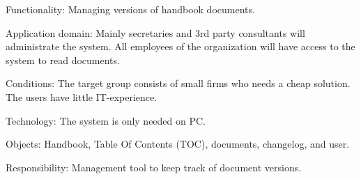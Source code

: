 Functionality: Managing versions of handbook documents.

Application domain: Mainly secretaries and 3rd party consultants will administrate the system. All employees of the organization will have access to the system to read documents.

Conditions: The target group consists of small firms who needs a cheap 
solution. The users have little IT-experience.

Technology: The system is only needed on PC.

Objects: Handbook, Table Of Contents (TOC), documents, changelog, and user.

Responsibility: Management tool to keep track of document versions.